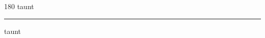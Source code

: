 
\begin{frame}
\begin{center}
\begin{turn}{180}
{\fontsize{2.5cm}{1em}\selectfont taunt}
\end{turn}
\vspace{1em}\par  
\hrule
\vspace{1em}\par  
{\fontsize{2.5cm}{1em}\selectfont taunt}
\end{center}
\end{frame}
